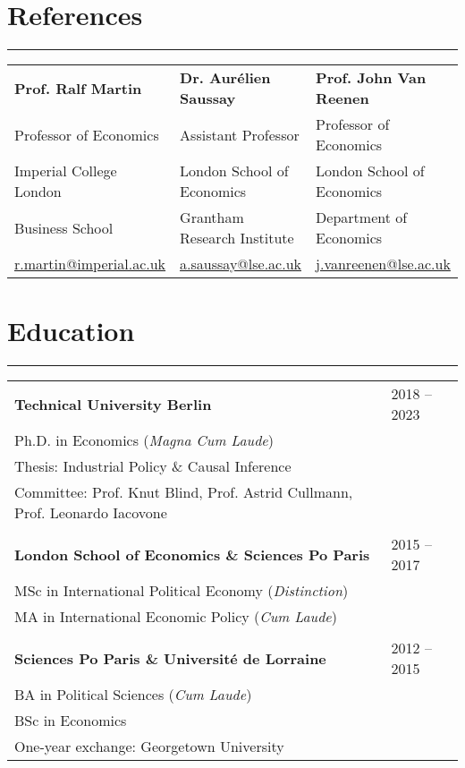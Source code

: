 \documentclass[10pt,a4paper]{article}
\begin{document}
\section*{References}
\hrule
\vspace{1mm}
\begin{tabularx}{\textwidth}{X X X}
\textbf{Prof. Ralf Martin} & \textbf{Dr. Aurélien Saussay} & \textbf{Prof. John Van Reenen} \\
Professor of Economics & Assistant Professor & Professor of Economics \\
Imperial College London & London School of Economics & London School of Economics \\
Business School & Grantham Research Institute & Department of Economics \\
\href{mailto:r.martin@imperial.ac.uk}{r.martin@imperial.ac.uk} & \href{mailto:a.saussay@lse.ac.uk}{a.saussay@lse.ac.uk} & \href{mailto:j.vanreenen@lse.ac.uk}{j.vanreenen@lse.ac.uk} \\
\end{tabularx}


\section*{Education}
\hrule
\vspace{1mm}
\begin{tabular}{@{}p{}@{}p{}@{}}
    \textbf{Technical University Berlin} & \hfill 2018 – 2023 \\
    Ph.D. in Economics (\textit{Magna Cum Laude}) & \\
    Thesis: Industrial Policy \& Causal Inference & \\
    Committee: Prof. Knut Blind, Prof. Astrid Cullmann, Prof. Leonardo Iacovone & \\
    & \\
    \textbf{London School of Economics \& Sciences Po Paris} & \hfill 2015 – 2017 \\
    MSc in International Political Economy (\textit{Distinction}) & \\
    MA in International Economic Policy (\textit{Cum Laude}) & \\
    & \\
    \textbf{Sciences Po Paris \& Université de Lorraine} & \hfill 2012 – 2015 \\
    BA in Political Sciences (\textit{Cum Laude}) & \\
    BSc in Economics & \\
    One-year exchange: Georgetown University & \\
\end{tabular}
\end{document}
